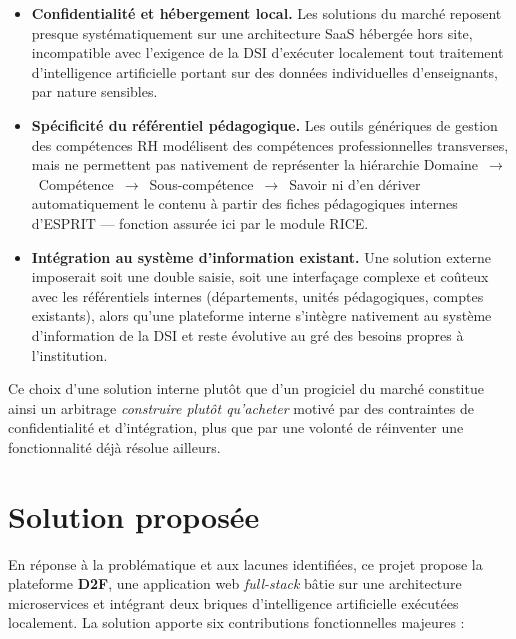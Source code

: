 \documentclass[12pt,a4paper]{report}
\begin{document}
\begin{itemize}[leftmargin=1.2cm]
  \item \textbf{Confidentialité et hébergement local.} Les solutions du marché
  reposent presque systématiquement sur une architecture SaaS hébergée hors site,
  incompatible avec l'exigence de la DSI d'exécuter localement tout traitement
  d'intelligence artificielle portant sur des données individuelles
  d'enseignants, par nature sensibles.

  \item \textbf{Spécificité du référentiel pédagogique.} Les outils génériques
  de gestion des compétences RH modélisent des compétences professionnelles
  transverses, mais ne permettent pas nativement de représenter la hiérarchie
  \mbox{Domaine $\rightarrow$ Compétence $\rightarrow$ Sous-compétence $\rightarrow$ Savoir}
  ni d'en dériver automatiquement le contenu à partir des fiches pédagogiques
  internes d'ESPRIT --- fonction assurée ici par le module RICE.

  \item \textbf{Intégration au système d'information existant.} Une solution
  externe imposerait soit une double saisie, soit une interfaçage complexe et
  coûteux avec les référentiels internes (départements, unités pédagogiques,
  comptes existants), alors qu'une plateforme interne s'intègre nativement au
  système d'information de la DSI et reste évolutive au gré des besoins propres
  à l'institution.
\end{itemize}

Ce choix d'une solution interne plutôt que d'un progiciel du marché constitue
ainsi un arbitrage \emph{construire plutôt qu'acheter} motivé par des contraintes
de confidentialité et d'intégration, plus que par une volonté de réinventer une
fonctionnalité déjà résolue ailleurs.

\section{Solution proposée}

En réponse à la problématique et aux lacunes identifiées, ce projet propose la
plateforme \textbf{D2F}, une application web \textit{full-stack} bâtie sur une
architecture microservices et intégrant deux briques d'intelligence artificielle
exécutées localement. La solution apporte six contributions fonctionnelles
majeures :
\end{document}
